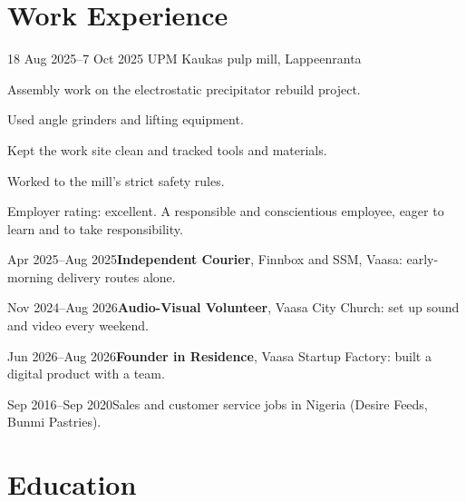 \documentclass[a4paper,11pt]{article}
\begin{document}
\section{Work Experience}
\begin{cventry}{18 Aug 2025--7 Oct 2025}{}
  UPM Kaukas pulp mill, Lappeenranta\par
  Assembly work on the electrostatic precipitator rebuild project.\par
  Used angle grinders and lifting equipment.\par
  Kept the work site clean and tracked tools and materials.\par
  Worked to the mill's strict safety rules.\par
  Employer rating: excellent. A responsible and conscientious employee, eager to learn and to take responsibility.
\end{cventry}
\begin{cventry}{Apr 2025--Aug 2025}{\textbf{Independent Courier}, Finnbox and SSM, Vaasa: early-morning delivery routes alone.}
\end{cventry}
\begin{cventry}{Nov 2024--Aug 2026}{\textbf{Audio-Visual Volunteer}, Vaasa City Church: set up sound and video every weekend.}
\end{cventry}
\begin{cventry}{Jun 2026--Aug 2026}{\textbf{Founder in Residence}, Vaasa Startup Factory: built a digital product with a team.}
\end{cventry}
\begin{cventry}{Sep 2016--Sep 2020}{Sales and customer service jobs in Nigeria (Desire Feeds, Bunmi Pastries).}
\end{cventry}

\section{Education}

\section{}
\end{document}
